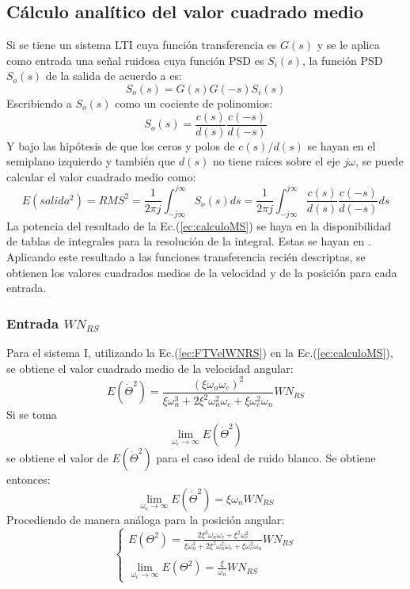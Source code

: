 \documentclass[a4paper,11pt,twoside]{IT-CNEA}
\begin{document}
\subsection{Cálculo analítico del valor cuadrado medio}
\label{seccion:calculosValorCuadradoMedio}
Si se tiene un sistema LTI cuya función transferencia es $G(s)$ y se le aplica como entrada una señal ruidosa cuya función PSD es $S_i(s)$, la función PSD $S_o(s)$ de la salida de acuerdo a \cite{Grover} es:
\begin{equation}
S_o(s)=G(s)G(-s)S_i(s)
\end{equation}
Escribiendo a $S_o(s)$ como un cociente de polinomios:
\begin{equation}
S_o(s)=\frac{c(s)}{d(s)}\frac{c(-s)}{d(-s)}
\label{ec}
\end{equation}
Y bajo las hipótesis de que los ceros y polos de $c(s)/d(s)$ se hayan en el semiplano izquierdo y también que $d(s)$ no tiene raíces sobre el eje $j\omega$, se puede calcular el valor cuadrado medio como:
\begin{equation}
E\left(salida^2\right)=RMS^2=\frac{1}{2\pi j}\int_{-j\infty}^{j\infty}S_o(s)ds=\frac{1}{2\pi j}\int_{-j\infty}^{j\infty}\frac{c(s)}{d(s)}\frac{c(-s)}{d(-s)}ds
\label{ec:calculoMS}
\end{equation}
La potencia del resultado de la Ec.(\ref{ec:calculoMS}) se haya en la disponibilidad de tablas de integrales para la resolución de la integral. Estas se hayan en \cite{Grover}.
\\Aplicando este resultado a las funciones transferencia recién descriptas, se obtienen los valores cuadrados medios de la velocidad y de la posición para cada entrada.
\subsubsection{Entrada $WN_{RS}$}
Para el sistema I, utilizando la Ec.(\ref{ec:FTVelWNRS}) en la Ec.(\ref{ec:calculoMS}), se obtiene el valor cuadrado medio de la velocidad angular:
\begin{equation}
E\left( \dot{\Theta}^2\right)=\frac{\left(\xi\omega_n\omega_c \right)^2}{\xi\omega_n^3+2\xi^2\omega_n^2\omega_c+\xi\omega_c^2\omega_n}WN_{RS}
\end{equation}
Si se toma $$\lim_{\omega_c\to\infty}E\left( \dot{\Theta}^2\right)$$ se obtiene el valor de $E\left( \dot{\Theta}^2\right)$ para el caso ideal de ruido blanco. Se obtiene entonces:
\begin{equation}
\lim_{\omega_c\to\infty}E\left( \dot{\Theta}^2\right)=\xi\omega_nWN_{RS}
\label{ec:limiteVelWNRSI}
\end{equation}
Procediendo de manera análoga para la posición angular:
\begin{equation}
\begin{cases}
E\left( \Theta^2\right)=\frac{2\xi^3\omega_n\omega_c+\xi^2\omega_c^2}{\xi\omega_n^3+2\xi^2\omega_n^2\omega_c+\xi\omega_c^2\omega_n}WN_{RS}
\\
\\
\lim_{\omega_c\to\infty}E\left( \Theta^2\right)=\frac{\xi}{\omega_n}WN_{RS}
\end{cases}
\label{ec:limitePosWNRSI}
\end{equation}
\end{document}
